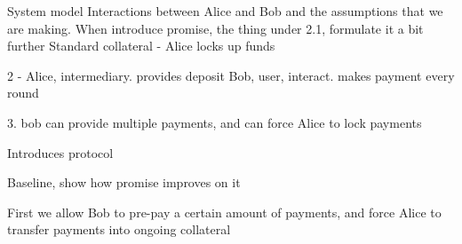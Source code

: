 

System model
Interactions between Alice and Bob and the assumptions that we are making. 
When introduce promise, the thing under 2.1, formulate it a bit further
Standard collateral - Alice locks up funds

2 - Alice, intermediary. provides deposit
Bob, user, interact. makes payment every round

3. bob can provide multiple payments, and can force Alice to lock payments 

Introduces protocol

Baseline, show how promise improves on it

First we allow Bob to pre-pay a certain amount of payments, and force Alice to transfer payments into ongoing collateral

